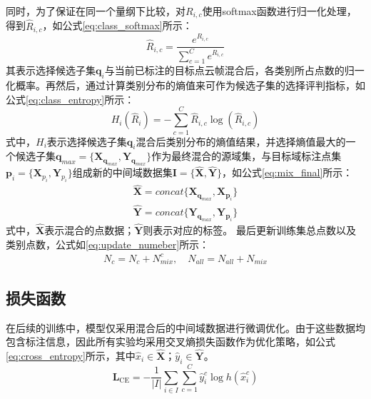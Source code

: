     同时，为了保证在同一个量纲下比较，对$R_{i,c}$使用softmax函数进行归一化处理，得到$\hat{R}_{i,c}$，如公式\eqref{eq:class_softmax}所示：
    \begin{equation}
        \label{eq:class_softmax}
        \hat{R}_{i,c}=\frac{e^{R_{i,c}}}{\sum^C_{c=1}e^{R_{i,c}}}
    \end{equation}
    其表示选择候选子集$\mathbf{q}_i$与当前已标注的目标点云帧混合后，各类别所占点数的归一化概率。再然后，通过计算类别分布的熵值来可作为候选子集的选择评判指标，如公式\eqref{eq:class_entropy}所示：
    \begin{equation}
        \label{eq:class_entropy}
        H_i(\hat{R}_{i})=-\sum_{c=1}^{C} \hat{R}_{i,c}\log(\hat{R}_{i,c})
    \end{equation}
    式中，$H_i$表示选择候选子集$\mathbf{q}_i$混合后类别分布的熵值结果，并选择熵值最大的一个候选子集$\mathbf{q}_{max}=\{\mathbf{X}_{\mathbf{q}_{max}},\mathbf{Y}_{\mathbf{q}_{max}}\}$作为最终混合的源域集，与目标域标注点集$\mathbf{p}_i=\{\mathbf{X}_{p_i},\mathbf{Y}_{p_i}\}$组成新的中间域数据集$\mathbf{I}=\{\mathbf{\hat{X},\hat{Y}}\}$，如公式\eqref{eq:mix_final}所示：
    \begin{equation}
        \label{eq:mix_final}
        \begin{aligned}
            \mathbf{\hat{X}}=concat\{\mathbf{X}_{\mathbf{q}_{max}},\mathbf{X}_{\mathbf{p}_i}\}
            \\
        \mathbf{\hat{Y}}=concat\{\mathbf{Y}_{\mathbf{q}_{max}},\mathbf{Y}_{\mathbf{p}_i}\}
        \end{aligned}
    \end{equation}
    式中，$\mathbf{\hat{X}}$表示混合的点数据；$\mathbf{\hat{Y}}$则表示对应的标签。%
    最后更新训练集总点数以及类别点数，公式如\eqref{eq:update_numeber}所示：
    \begin{equation}
        \label{eq:update_numeber}
        \begin{aligned}
            N_c=N_c+N^c_{mix}, \quad
            N_{all}=N_{all}+N_{mix}
        \end{aligned}
    \end{equation}
    
    \subsection{损失函数}
    在后续的训练中，模型仅采用混合后的中间域数据进行微调优化。由于这些数据均包含标注信息，因此所有实验均采用交叉熵损失函数作为优化策略，如公式\eqref{eq:cross_entropy}所示，其中$\hat{x}_{i} \in \hat{\mathbf{X}}$；$\hat{y}_{i} \in \hat{\mathbf{Y}}$。
    \begin{equation}
        \label{eq:cross_entropy}
        \mathbf{L}_{\text{CE}} = - \frac{1}{|I|} \sum_{i \in I} \sum_{c=1}^{C} \hat{y}_{i}^{c} \log h(\hat{x}_{i}^{c})
    \end{equation}


